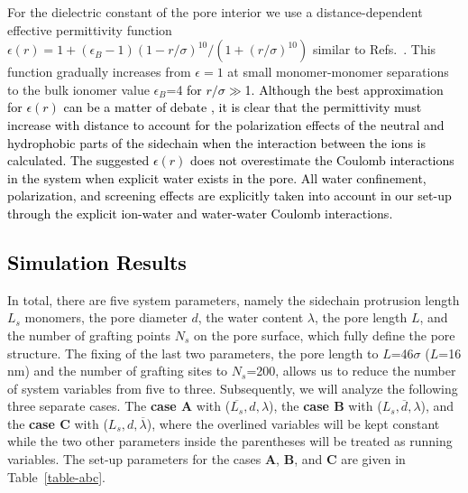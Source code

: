 \documentclass[3p,english,preprint]{elsarticle}
\newcommand{\need}[1]{\textcolor{black}{#1}}
\newcommand{\mod}[1]{\textcolor{black}{#1}}
\newcommand{\mage}[1]{\textcolor{black}{#1}}
\begin{document}
For the dielectric constant  of the pore interior we use a distance-dependent 
effective permittivity function 
$
\epsilon(r) = 
 1 + 
\left( 
         \epsilon_B - 1  
\right)
\left(
    1 - r/\sigma 
\right)^{10} / 
\left(
    1 + (r/\sigma)^{10}  
\right)
$
similar to Refs.~\cite{allahyarov-2015,allahyarov-2011-diff-archit}. 
This function gradually increases from $\epsilon=1$ at small monomer-monomer separations 
to the bulk ionomer value $\epsilon_B$=4 
{\need{ 
for $r/\sigma \gg$1.
}}
{\need{ 
 Although the best approximation for $\epsilon(r)$ can be a matter of debate 
\cite{paddison-2003-review,paul-paddison-2005-pore,taylor-1992}, it
is clear that the permittivity must increase with distance 
to  account for the polarization effects of the neutral and hydrophobic parts of the sidechain 
 when the interaction between the ions is calculated. 
The suggested $\epsilon(r)$ does not  overestimate the Coulomb interactions
in the system when explicit water exists in the pore. All  water confinement, polarization, and screening effects are explicitly taken into 
account in our set-up through the explicit ion-water and water-water Coulomb interactions. 
}}


{\mod{ 
\section{Simulation Results}
}}
\label{sim-results}

In total, there are five  system parameters, namely 
 the sidechain protrusion length  $L_s$ monomers, 
 the pore diameter $d$, 
 the water content  $\lambda$, 
 the pore length $L$, 
 and 
 the number of grafting points   $N_s$ on the pore surface,
which fully define the pore structure.  
The fixing of the last two parameters, the 
pore length to $L$=46$\sigma$ ($L$=16 nm) and the 
number of grafting sites to $N_s$=200, allows us to reduce the 
number of system variables from five to three. 
Subsequently,    
we will analyze the  following three separate cases.  
The {\bf case A} with ($\overline{L_s},d,\lambda$), 
the {\bf case B} with ($L_s,\overline{d},\lambda$), and 
the {\bf case C} with ($L_s,d,\overline{\lambda}$), where
the overlined variables will be kept constant while  the two other 
parameters inside the parentheses will be treated as running variables.
The set-up parameters for the cases {\bf A}, {\bf B}, and {\bf C}
 are given in Table~\ref{table-abc}. 
\end{document}
